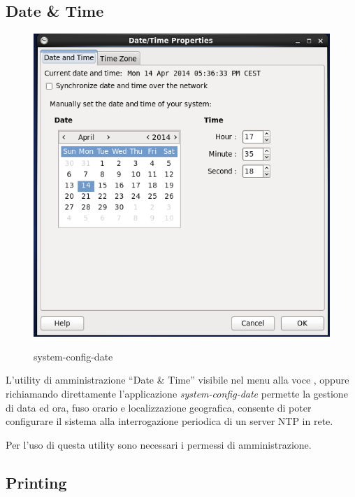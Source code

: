 \subsection{Date \& Time}

\begin{figure}[!ht]
 \centering
 \includegraphics[scale=0.5]{Immagini/sys_conf_date1.png}
 \label{fig:System Config Date}
 \caption{system-config-date}
\end{figure}


L'utility di amministrazione ``Date \& Time'' visibile nel menu alla voce , oppure richiamando direttamente l'applicazione \textit{system-config-date} permette la gestione di data ed ora, fuso orario e localizzazione geografica, consente di poter configurare il sistema alla interrogazione periodica di un server NTP in rete. 

Per l'uso di questa utility sono necessari i permessi di amministrazione.

\subsection{Printing}

